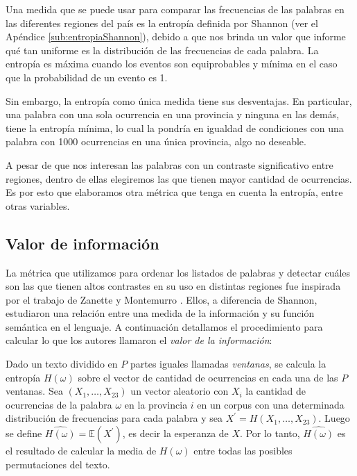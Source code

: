 Una medida que se puede usar para comparar las frecuencias de las palabras en las diferentes regiones del país es la entropía definida por Shannon (ver el Apéndice \ref{sub:entropiaShannon}), debido a que nos brinda un valor que informe qué tan uniforme es la distribución de las frecuencias de cada palabra. La entropía es máxima cuando los eventos son equiprobables y mínima en el caso que la probabilidad de un evento es 1.

Sin embargo, la entropía como única medida tiene sus desventajas. En particular, una palabra con una sola ocurrencia en una provincia y ninguna en las demás, tiene la entropía mínima, lo cual la pondría en igualdad de condiciones con una palabra con 1000 ocurrencias en una única provincia, algo no deseable.

A pesar de que nos interesan las palabras con un contraste significativo entre regiones, dentro de ellas elegiremos las que tienen mayor cantidad de ocurrencias. Es por esto que elaboramos otra métrica que tenga en cuenta la entropía, entre otras variables.


\subsection{Valor de información}
La métrica que utilizamos para ordenar los listados de palabras y detectar cuáles son
las que tienen altos contrastes en su uso en distintas regiones fue inspirada por el
trabajo de Zanette y Montemurro \cite{montemurro2010towards}.
Ellos, a diferencia de Shannon, estudiaron una relación entre una medida de la información y su función semántica en el lenguaje.
A continuación detallamos el procedimiento para calcular lo que los autores llamaron
el \textit{valor de la información}:

Dado un texto dividido en $P$ partes iguales llamadas \textit{ventanas}, se calcula la entropía  $H(\omega)$ sobre el vector de cantidad de ocurrencias en cada una de las $P$ ventanas.
Sea $(X_1,\dots,X_{23})$ un vector aleatorio con $X_i$ la cantidad de ocurrencias de la palabra $\omega$ en la provincia $i$ en un corpus con una determinada distribución de frecuencias para cada palabra y sea $X^\prime = H(X_1,\dots,X_{23})$. Luego se define $\widehat{H(\omega)} = \mathbb{E}(X^\prime)$, es decir la esperanza de $X$. Por lo tanto, $\widehat{H(\omega)}$ es el resultado de calcular la media de $H(\omega)$ entre todas las posibles permutaciones del texto.

